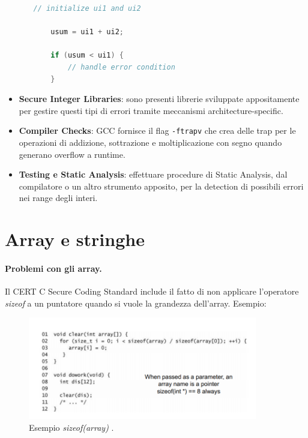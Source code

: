 \begin{itemize}
\begin{itemize}
\begin{lstlisting}[language=C]
    // initialize ui1 and ui2

    usum = ui1 + ui2;

    if (usum < ui1) {
        // handle error condition
    }
                    \end{lstlisting}
          \end{itemize}
    \item \textbf{Secure Integer Libraries}:
          sono presenti librerie sviluppate appositamente per gestire questi
          tipi di errori tramite meccanismi architecture-specific.
    \item \textbf{Compiler Checks}:
          GCC fornisce il flag \verb|-ftrapv| che crea delle trap per le
          operazioni di addizione, sottrazione e moltiplicazione con segno
          quando generano overflow a runtime.
    \item \textbf{Testing e Static Analysis}:
          effettuare procedure di Static Analysis,
          dal compilatore o un altro strumento apposito,
          per la detection di possibili errori nei range degli interi.
\end{itemize}

\section{Array e stringhe}

\paragraph{Problemi con gli array.}
Il  CERT C Secure Coding Standard include il fatto di non applicare
l'operatore \textit{sizeof} a un puntatore quando si vuole la grandezza dell'array.
Esempio:

\begin{figure}[H]
    \centering
    \includegraphics[width=10cm, keepaspectratio]{capitoli/secure_coding/img/cap_2/sizeof_array.png}
    \caption{Esempio \textit{sizeof(array)} .}\label{fig:sizeof_array}
\end{figure}

